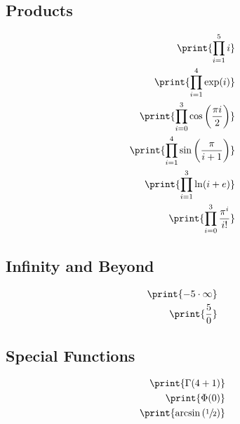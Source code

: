 \documentclass[oneside, a4paper]{article}
\begin{document}
\subsection*{Products}
\begin{program}
\begin{align*}
    \print{\prod_{i=1}^{5} i}\\
    \print{\prod_{i=1}^4 \exp(i)}\\
    \print{\prod_{i=0}^{3}\cos\left(\frac{\pi i}{2}\right)}\\
    \print{\prod_{i=1}^{4} \sin\left(\frac{\pi}{i+1}\right)}\\
    \print{\prod_{i=1}^{3} \ln(i+e)}\\
    \print{\prod_{i=0}^{3} \frac{\pi^i}{i!}}
\end{align*}
\end{program}


\subsection*{Infinity and Beyond}
\begin{program}
\begin{align*}
    \print{-5\cdot \infty}\\
    \print{\frac{5}{0}}
\end{align*}
\end{program}

\subsection*{Special Functions}
\begin{program}
    \begin{align*}
        \print{\Gamma(4+1)}\\
        \print{\Phi(0)}\\
        \print{\arcsin\left(\sfrac{1}{2}\right)}\\
    \end{align*}
\end{program}



\end{document}
